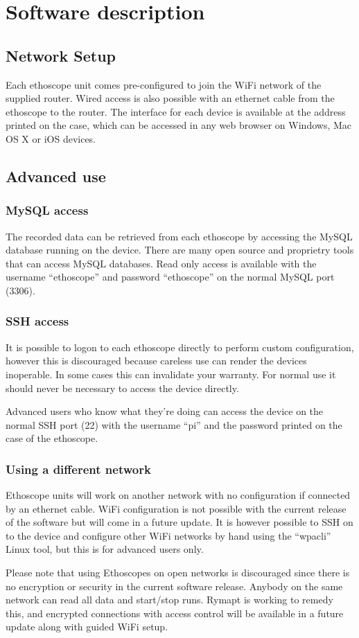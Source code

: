 \chapter{Software description}\label{ch:software}

\section{Network Setup}\label{sec:network}
Each ethoscope unit comes pre-configured to join the WiFi network of the supplied router. Wired
access is also possible with an ethernet cable from the ethoscope to the router. The interface
for each device is available at the address printed on the case, which can be accessed in any web
browser on Windows, Mac OS X or iOS devices.

\section{Advanced use}\label{sec:advanced}
\subsection{MySQL access}\label{subsec:mysql}
The recorded data can be retrieved from each ethoscope by accessing the MySQL database running on
the device. There are many open source and proprietry tools that can access MySQL databases. Read
only access is available with the username ``ethoscope'' and password ``ethoscope'' on the normal MySQL
port (3306).

\subsection{SSH access}\label{subsec:mysql}
It is possible to logon to each ethoscope directly to perform custom configuration, however this is
discouraged because careless use can render the devices inoperable. In some cases this can invalidate
your warranty. For normal use it should never be necessary to access the device directly.

Advanced users who know what they're doing can access the device on the normal SSH port (22) with
the username ``pi'' and the password printed on the case of the ethoscope.

\subsection{Using a different network}\label{subsec:mysql}
Ethoscope units will work on another network with no configuration if connected by an ethernet cable.
WiFi configuration is not possible with the current release of the software but will come in a
future update. It is however possible to SSH on to the device and configure other WiFi networks by
hand using the ``wpa\textunderscore{}cli'' Linux tool, but this is for advanced users only.

Please note that using Ethoscopes on open networks is discouraged since there is no encryption or
security in the current software release. Anybody on the same network can read all data and
start/stop runs. Rymapt is working to remedy this, and encrypted connections with access control
will be available in a future update along with guided WiFi setup.
